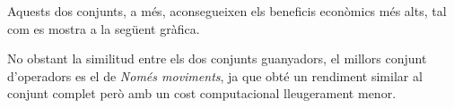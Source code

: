 

\vspace{0.5cm}

Aquests dos conjunts, a més, aconsegueixen els beneficis econòmics més alts, tal com es mostra a la següent gràfica.

\vspace{0.5cm}



\vspace{0.5cm}

No obstant la similitud entre els dos conjunts guanyadors, el millors conjunt d’operadors es el de \textit{Només moviments}, ja que obté un rendiment similar al conjunt complet però amb un cost computacional lleugerament menor.





